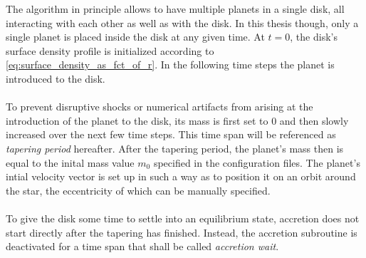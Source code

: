     \newpage \noindent
    The algorithm in principle allows to have multiple planets in a single disk,
    all interacting with each other as well as with the disk. In this thesis 
    though,
    only a single planet is placed inside the disk at any given time. At $t=0$, the 
    disk's surface density profile is initialized according to 
    \autoref{eq:surface_density_as_fct_of_r}.
    In the following time steps the planet is introduced to the disk. \\
    \\
    To prevent disruptive shocks or numerical artifacts from arising at 
    the introduction of the planet to the disk,
    its mass is first set to $0$ and then slowly 
    increased over the next few time steps. This time span will be referenced 
    as \textit{tapering period} hereafter. After the tapering period, the 
    planet's mass then is equal to the inital mass value $m_0$ specified in the 
    configuration files. The planet's intial velocity vector is set up in 
    such a way as to position it on an orbit around the star, the 
    eccentricity of which can be manually specified. \\
    \\
    To give the disk some time to settle into an equilibrium state, 
    accretion does not start directly after the tapering has finished.
    Instead, the accretion subroutine is deactivated for a time span that 
    shall be called \textit{accretion wait}. \\
    \\
